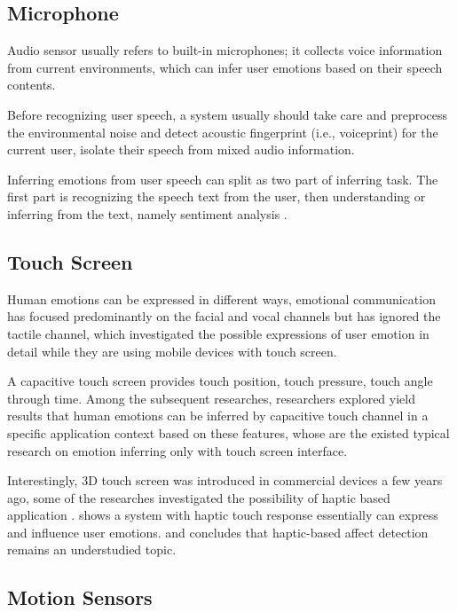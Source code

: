 \subsection{Microphone}\label{subsec:audio}
Audio sensor usually refers to built-in microphones; it collects voice information from current environments, which can infer user emotions based on their speech contents.

Before recognizing user speech, a system usually should take care and preprocess the environmental noise and detect acoustic fingerprint (i.e., voiceprint) \cite{boles2017voice} for the current user, isolate their speech from mixed audio information.

Inferring emotions from user speech can split as two part of inferring task. The first part is recognizing the speech text from the user\cite{mikolov2010recurrent, google2017}, then understanding or inferring from the text, namely sentiment analysis \cite{Rajalakshmi2017ACS}.

\subsection{Touch Screen}\label{subsec:touch}

Human emotions can be expressed in different ways, emotional communication has focused predominantly on the facial and vocal channels but has ignored the tactile channel\cite{hertenstein2009communication}, which investigated the possible expressions of user emotion in detail while they are using mobile devices with touch screen.

A capacitive touch screen provides touch position, touch pressure, touch angle through time. Among the subsequent researches\cite{Gao2012, Shah2015, Mottelson2016, bhattacharya2017predictive}, researchers explored yield results that human emotions can be inferred by capacitive touch channel in a specific application context based on these features, whose are the existed typical research on emotion inferring only with touch screen interface.

Interestingly, 3D touch screen was introduced in commercial devices a few years ago, some of the researches investigated the possibility of haptic based application \cite{Eid2016}. \cite{Mazzoni2016, Lentini2017} shows a system with haptic touch response essentially can express and influence user emotions. and \cite{Bhattacharya2017} concludes that haptic-based affect detection remains an understudied topic.

\subsection{Motion Sensors}\label{subsec:motion}

